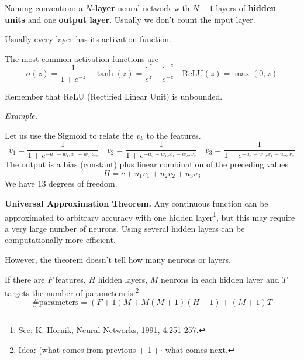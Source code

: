 Naming convention: a $N$\textbf{-layer} neural network with $N-1$ layers of \textbf{hidden units} and one \textbf{output layer}. Usually we don't count the input layer.

Usually every layer has its activation function.


The most common activation functions are
\begin{equation*}
    \sigma (z) =\frac{1}{1+e^{-z}} \quad \tanh(z) =\frac{e^{z} -e^{-z}}{e^{z} +e^{-z}} \quad \text{ReLU}(z) =\max(0,z)
\end{equation*}


Remember that ReLU (Rectified Linear Unit) is unbounded.

\textit{Example.}


Let us use the Sigmoid to relate the $v_{k}$ to the features.
\begin{equation*}
    v_{1} =\frac{1}{1+e^{-a_{1} -w_{11} x_{1} -w_{21} x_{2}}} \quad v_{2} =\frac{1}{1+e^{-a_{2} -w_{12} x_{1} -w_{22} x_{2}}} \quad v_{3} =\frac{1}{1+e^{-a_{3} -w_{13} x_{1} -w_{23} x_{2}}}
\end{equation*}
The output is a bias (constant) plus linear combination of the preceding values
\begin{equation*}
    H=c+u_{1} v_{1} +u_{2} v_{2} +u_{3} v_{3}
\end{equation*}
We have $13$ degrees of freedom.

\textbf{Universal Approximation Theorem. }Any continuous function can be approximated to arbitrary accuracy with one hidden layer\footnote{See: K. Hornik, Neural Networks, 1991, 4:251-257.}, but this may require a very large number of neurons. Using several hidden layers can be computationally more efficient.

However, the theorem doesn't tell how many neurons or layers.

If there are $F$ features, $H$ hidden layers, $M$ neurons in each hidden layer and $T$ targets the number of parameters is:\footnote{Idea: (what comes from previous + 1 ) $\cdot$ what comes next.}
\begin{equation*}
    \text{\#parameters} =(F+1) M+M(M+1)(H-1) +(M+1) T
\end{equation*}

